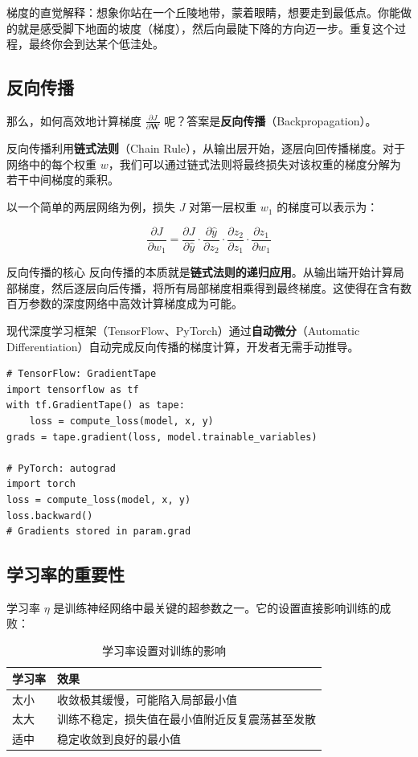 梯度的直觉解释：想象你站在一个丘陵地带，蒙着眼睛，想要走到最低点。你能做的就是感受脚下地面的坡度（梯度），然后向最陡下降的方向迈一步。重复这个过程，最终你会到达某个低洼处。

\subsection{反向传播}

那么，如何高效地计算梯度 $\frac{\partial J}{\partial \mathbf{W}}$ 呢？答案是\textbf{反向传播}（Backpropagation）。

反向传播利用\textbf{链式法则}（Chain Rule），从输出层开始，逐层向回传播梯度。对于网络中的每个权重 $w$，我们可以通过链式法则将最终损失对该权重的梯度分解为若干中间梯度的乘积。

以一个简单的两层网络为例，损失 $J$ 对第一层权重 $w_1$ 的梯度可以表示为：

$$\frac{\partial J}{\partial w_1} = \frac{\partial J}{\partial \hat{y}} \cdot \frac{\partial \hat{y}}{\partial z_2} \cdot \frac{\partial z_2}{\partial z_1} \cdot \frac{\partial z_1}{\partial w_1}$$

\begin{importantbox}{反向传播的核心}
反向传播的本质就是\textbf{链式法则的递归应用}。从输出端开始计算局部梯度，然后逐层向后传播，将所有局部梯度相乘得到最终梯度。这使得在含有数百万参数的深度网络中高效计算梯度成为可能。
\end{importantbox}

现代深度学习框架（TensorFlow、PyTorch）通过\textbf{自动微分}（Automatic Differentiation）自动完成反向传播的梯度计算，开发者无需手动推导。

\begin{lstlisting}[caption={TensorFlow 和 PyTorch 中的自动微分}]
# TensorFlow: GradientTape
import tensorflow as tf
with tf.GradientTape() as tape:
    loss = compute_loss(model, x, y)
grads = tape.gradient(loss, model.trainable_variables)

# PyTorch: autograd
import torch
loss = compute_loss(model, x, y)
loss.backward()
# Gradients stored in param.grad
\end{lstlisting}

\subsection{学习率的重要性}

学习率 $\eta$ 是训练神经网络中最关键的超参数之一。它的设置直接影响训练的成败：

\begin{table}[H]
\centering
\begin{tabular}{lp{9cm}}
\toprule
\textbf{学习率} & \textbf{效果} \\
\midrule
太小 & 收敛极其缓慢，可能陷入局部最小值 \\
太大 & 训练不稳定，损失值在最小值附近反复震荡甚至发散 \\
适中 & 稳定收敛到良好的最小值 \\
\bottomrule
\end{tabular}
\caption{学习率设置对训练的影响}
\end{table}

